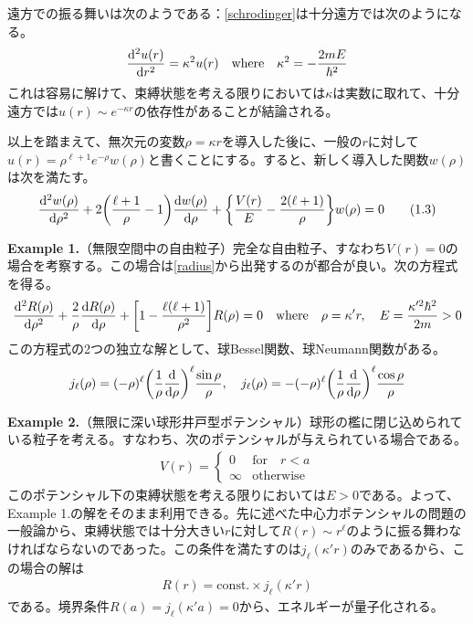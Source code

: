 \documentclass[dvipdfmx]{jarticle}
\theoremstyle{plain}
\begin{document}
\begin{enumerate}
  遠方での振る舞いは次のようである：\eqref{schrodinger}は十分遠方では次のようになる。
  \begin{align}
    \dv[2]{u(r)}{r} = \kappa^2u(r) \quad \mathrm{where} \quad \kappa^2 = -\frac{2mE}{\hbar^2}
  \end{align}
  これは容易に解けて、束縛状態を考える限りにおいては$\kappa$は実数に取れて、十分遠方では$u(r) \sim e^{-\kappa r}$の依存性があることが結論される。

  以上を踏まえて、無次元の変数$\rho = \kappa r$を導入した後に、一般の$r$に対して$u(r) = \rho^{\ell + 1}e^{-\rho}w(\rho)$と書くことにする。すると、新しく導入した関数$w(\rho)$は次を満たす。
  \begin{align}
    \dv[2]{w(\rho)}{\rho} + 2\qty(\frac{\ell + 1}{\rho} - 1)\dv{w(\rho)}{\rho} + \qty{\frac{V(r)}{E} - \frac{2(\ell + 1)}{\rho}}w(\rho) = 0 \tag{1.3} \label{rho}
  \end{align}

  \textbf{Example 1.}（無限空間中の自由粒子）完全な自由粒子、すなわち$V(r) = 0$の場合を考察する。この場合は\eqref{radius}から出発するのが都合が良い。次の方程式を得る。
    \begin{align}
      \dv[2]{R(\rho)}{\rho} + \frac{2}{\rho}\dv{R(\rho)}{\rho} + \qty[1 - \frac{\ell (\ell + 1)}{\rho^2}] R(\rho) = 0 \quad \mathrm{where} \quad \rho = \kappa' r, \quad E = \frac{\kappa'^2\hbar^2}{2m} > 0
    \end{align}
    この方程式の2つの独立な解として、球Bessel関数、球Neumann関数がある。
    \begin{align}
      j_\ell(\rho) = (-\rho)^\ell \qty(\frac{1}{\rho}\dv{\rho})^\ell \frac{\sin\rho}{\rho}, \quad
      j_\ell(\rho) = -(-\rho)^\ell \qty(\frac{1}{\rho}\dv{\rho})^\ell \frac{\cos\rho}{\rho}
    \end{align}

    \textbf{Example 2.}（無限に深い球形井戸型ポテンシャル）球形の檻に閉じ込められている粒子を考える。すなわち、次のポテンシャルが与えられている場合である。
    \begin{align}
      V(r)= \left\{ \begin{array}{ll}
        0 & \mathrm{for} \quad r < a \\
        \infty & \mathrm{otherwise}
        \end{array}
        \right.
    \end{align}
    このポテンシャル下の束縛状態を考える限りにおいては$E > 0$である。よって、Example 1.の解をそのまま利用できる。先に述べた中心力ポテンシャルの問題の一般論から、束縛状態では十分大きい$r$に対して$R(r) \sim r^\ell$のように振る舞わなければならないのであった。この条件を満たすのは$j_\ell(\kappa'r)$のみであるから、この場合の解は
    \begin{align}
      R(r) = \mathrm{const.} \times j_\ell(\kappa'r)
    \end{align}
    である。境界条件$R(a) = j_\ell(\kappa' a) = 0$から、エネルギーが量子化される。


\end{enumerate}
\end{document}
